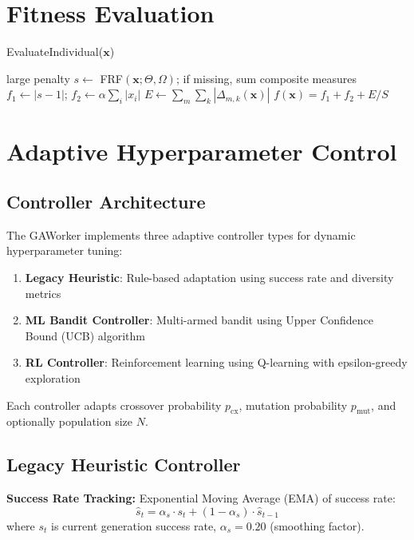 \documentclass[12pt,a4paper]{article}
\begin{document}
\section{Fitness Evaluation}
\begin{algorithm}[H]
\caption{EvaluateIndividual($\bm{x}$)}\label{alg:evaluate}
\begin{algorithmic}[1]
 \State \Return large penalty \EndIf
\State $s \leftarrow$ \textsc{FRF}$(\bm{x};\Theta,\Omega)$; if missing, sum composite measures
\State $f_1\leftarrow |s-1|$; $f_2\leftarrow \alpha\sum_i |x_i|$
\State $E\leftarrow \sum_{m}\sum_{k} |\Delta_{m,k}(\bm{x})|$
\State \Return $f(\bm{x}) = f_1 + f_2 + E/S$
\end{algorithmic}
\end{algorithm}

\section{Adaptive Hyperparameter Control}

\subsection{Controller Architecture}
The GAWorker implements three adaptive controller types for dynamic hyperparameter tuning:

\begin{enumerate}
\item \textbf{Legacy Heuristic}: Rule-based adaptation using success rate and diversity metrics
\item \textbf{ML Bandit Controller}: Multi-armed bandit using Upper Confidence Bound (UCB) algorithm
\item \textbf{RL Controller}: Reinforcement learning using Q-learning with epsilon-greedy exploration
\end{enumerate}

Each controller adapts crossover probability $p_{\text{cx}}$, mutation probability $p_{\text{mut}}$, and optionally population size $N$.

\subsection{Legacy Heuristic Controller}
\textbf{Success Rate Tracking:}
Exponential Moving Average (EMA) of success rate:
\begin{equation}
\hat{s}_t = \alpha_s \cdot s_t + (1 - \alpha_s) \cdot \hat{s}_{t-1} \label{eq:success_rate_ema}
\end{equation}
where $s_t$ is current generation success rate, $\alpha_s = 0.20$ (smoothing factor).
\end{document}

